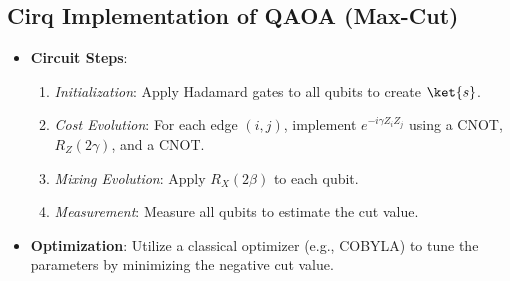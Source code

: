 \begin{multicols}{3}
                  \section*{Cirq Implementation of QAOA (Max-Cut)}
                  \begin{itemize}[leftmargin=*,nosep,topsep=0pt]
                    \item \textbf{Circuit Steps}:
                      \begin{enumerate}[nosep]
                        \item \textit{Initialization}: Apply Hadamard gates to all qubits to create \(\ket{s}\).
                        \item \textit{Cost Evolution}: For each edge \((i,j)\), implement
                            $e^{-i\gamma Z_i Z_j}$ using a CNOT, $R_Z(2\gamma)$, and a CNOT.
                        \item \textit{Mixing Evolution}: Apply \(R_X(2\beta)\) to each qubit.
                        \item \textit{Measurement}: Measure all qubits to estimate the cut value.
                      \end{enumerate}
                    \item \textbf{Optimization}: Utilize a classical optimizer (e.g., COBYLA) to tune the parameters by minimizing the negative cut value.
                  \end{itemize}
                \end{multicols}
                \endgroup
